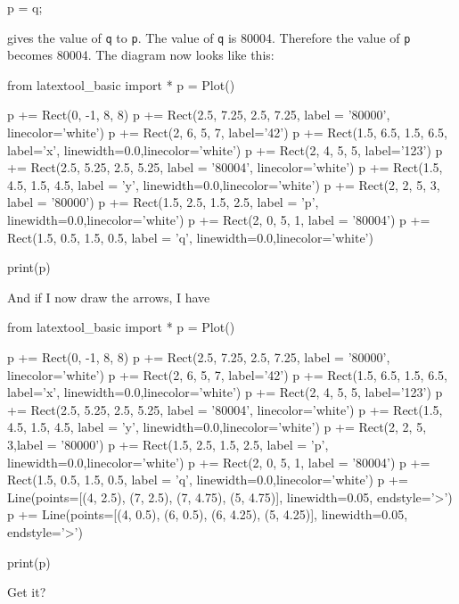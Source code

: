 \begin{consolethree}[escapeinside=||]
p = q;
\end{consolethree}

gives the value of \texttt{q} to \texttt{p}. The value of \texttt{q} is 80004.
Therefore the value of \texttt{p} becomes 80004. The diagram now looks like this:
\begin{python}
from latextool_basic import *
p = Plot()

p += Rect(0, -1, 8, 8)
p += Rect(2.5, 7.25, 2.5, 7.25, label = '80000', linecolor='white')
p += Rect(2, 6, 5, 7, label='42')
p += Rect(1.5, 6.5, 1.5, 6.5, label='x', linewidth=0.0,linecolor='white')
p += Rect(2, 4, 5, 5, label='123')
p += Rect(2.5, 5.25, 2.5, 5.25, label = '80004', linecolor='white')
p += Rect(1.5, 4.5, 1.5, 4.5, label = 'y', linewidth=0.0,linecolor='white')
p += Rect(2, 2, 5, 3, label = '80000')
p += Rect(1.5, 2.5, 1.5, 2.5, label = 'p', linewidth=0.0,linecolor='white')
p += Rect(2, 0, 5, 1, label = '80004')
p += Rect(1.5, 0.5, 1.5, 0.5, label = 'q', linewidth=0.0,linecolor='white')

print(p)
\end{python}

And if I now draw the arrows, I have

\begin{python}
from latextool_basic import *
p = Plot()

p += Rect(0, -1, 8, 8)
p += Rect(2.5, 7.25, 2.5, 7.25, label = '80000', linecolor='white')
p += Rect(2, 6, 5, 7, label='42')
p += Rect(1.5, 6.5, 1.5, 6.5, label='x', linewidth=0.0,linecolor='white')
p += Rect(2, 4, 5, 5, label='123')
p += Rect(2.5, 5.25, 2.5, 5.25, label = '80004', linecolor='white')
p += Rect(1.5, 4.5, 1.5, 4.5, label = 'y', linewidth=0.0,linecolor='white')
p += Rect(2, 2, 5, 3,label = '80000')
p += Rect(1.5, 2.5, 1.5, 2.5, label = 'p', linewidth=0.0,linecolor='white')
p += Rect(2, 0, 5, 1, label = '80004')
p += Rect(1.5, 0.5, 1.5, 0.5, label = 'q', linewidth=0.0,linecolor='white')
p += Line(points=[(4, 2.5), (7, 2.5), (7, 4.75), (5, 4.75)], linewidth=0.05, endstyle='>')
p += Line(points=[(4, 0.5), (6, 0.5), (6, 4.25), (5, 4.25)], linewidth=0.05, endstyle='>')

print(p)
\end{python}

Get it?







